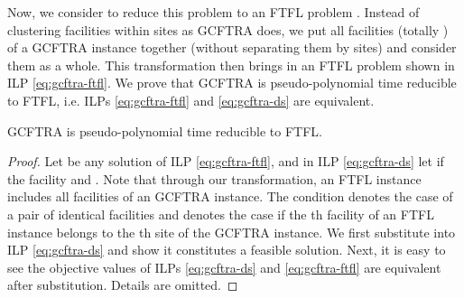 \documentclass[10pt]{llncs}
\begin{document}
{\small 
}{\small \par}

Now, we consider to reduce this problem to an FTFL problem \cite{Jain00FTFL}.
Instead of clustering facilities within sites as GCFTRA does, we put
all facilities (totally ) of a GCFTRA instance together
(without separating them by sites) and consider them as a whole. This
transformation then brings in an FTFL problem shown in ILP \eqref{eq:gcftra-ftfl}.
We prove that GCFTRA is pseudo-polynomial time reducible to FTFL,
i.e. ILPs \eqref{eq:gcftra-ftfl} and \eqref{eq:gcftra-ds} are equivalent.

{\small 
}{\small \par}
\begin{theorem}
GCFTRA is pseudo-polynomial time reducible to FTFL.\end{theorem}
\begin{proof}
Let  be any solution of ILP \eqref{eq:gcftra-ftfl},
and in ILP \eqref{eq:gcftra-ds} let  if the facility
 and . Note that
through our transformation, an FTFL instance includes all facilities
of an GCFTRA instance. The condition  denotes
the case of a pair of identical facilities and  denotes the
case if the th facility of an FTFL instance belongs to the th
site of the GCFTRA instance. We first substitute 
into ILP \eqref{eq:gcftra-ds} and show it constitutes a feasible
solution. Next, it is easy to see the objective values of ILPs \eqref{eq:gcftra-ds}
and \eqref{eq:gcftra-ftfl} are equivalent after substitution. Details
are omitted.
\end{proof}
 

 
\end{document}
